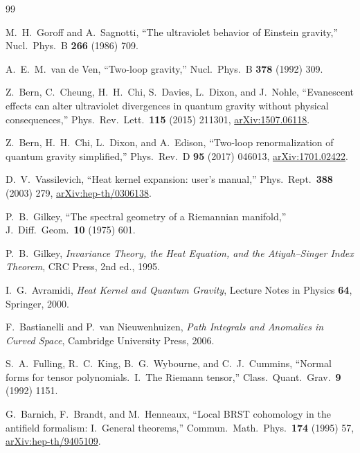 \documentclass[11pt,a4paper]{article}
\begin{document}
\begin{thebibliography}{99}

  M.~H.~Goroff and A.~Sagnotti,
  ``The ultraviolet behavior of Einstein gravity,''
  Nucl.\ Phys.\ B \textbf{266} (1986) 709.

  A.~E.~M.~van de Ven,
  ``Two-loop gravity,''
  Nucl.\ Phys.\ B \textbf{378} (1992) 309.

  Z.~Bern, C.~Cheung, H.~H.~Chi, S.~Davies, L.~Dixon, and J.~Nohle,
  ``Evanescent effects can alter ultraviolet divergences in quantum
  gravity without physical consequences,''
  Phys.\ Rev.\ Lett.\ \textbf{115} (2015) 211301,
  \href{https://arxiv.org/abs/1507.06118}{arXiv:1507.06118}.

  Z.~Bern, H.~H.~Chi, L.~Dixon, and A.~Edison,
  ``Two-loop renormalization of quantum gravity simplified,''
  Phys.\ Rev.\ D \textbf{95} (2017) 046013,
  \href{https://arxiv.org/abs/1701.02422}{arXiv:1701.02422}.

  D.~V.~Vassilevich,
  ``Heat kernel expansion: user's manual,''
  Phys.\ Rept.\ \textbf{388} (2003) 279,
  \href{https://arxiv.org/abs/hep-th/0306138}{arXiv:hep-th/0306138}.

  P.~B.~Gilkey,
  ``The spectral geometry of a Riemannian manifold,''
  J.\ Diff.\ Geom.\ \textbf{10} (1975) 601.

  P.~B.~Gilkey,
  \textit{Invariance Theory, the Heat Equation, and the
  Atiyah--Singer Index Theorem},
  CRC Press, 2nd ed., 1995.

  I.~G.~Avramidi,
  \textit{Heat Kernel and Quantum Gravity},
  Lecture Notes in Physics \textbf{64}, Springer, 2000.

  F.~Bastianelli and P.~van Nieuwenhuizen,
  \textit{Path Integrals and Anomalies in Curved Space},
  Cambridge University Press, 2006.

  S.~A.~Fulling, R.~C.~King, B.~G.~Wybourne, and C.~J.~Cummins,
  ``Normal forms for tensor polynomials.\ I.\ The Riemann tensor,''
  Class.\ Quant.\ Grav.\ \textbf{9} (1992) 1151.

  G.~Barnich, F.~Brandt, and M.~Henneaux,
  ``Local BRST cohomology in the antifield formalism:
  I.~General theorems,''
  Commun.\ Math.\ Phys.\ \textbf{174} (1995) 57,
  \href{https://arxiv.org/abs/hep-th/9405109}{arXiv:hep-th/9405109}.


\end{thebibliography}
\end{document}
